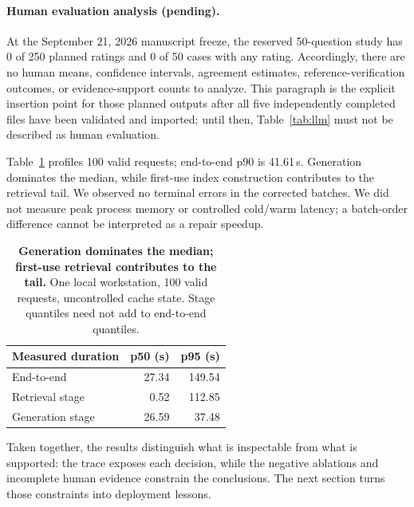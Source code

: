 \paragraph{Human evaluation analysis (pending).}
At the September 21, 2026 manuscript freeze, the reserved 50-question study has 0 of 250 planned ratings and 0 of 50 cases with any rating. Accordingly, there are no human means, confidence intervals, agreement estimates, reference-verification outcomes, or evidence-support counts to analyze. This paragraph is the explicit insertion point for those planned outputs after all five independently completed files have been validated and imported; until then, Table~\ref{tab:llm} must not be described as human evaluation.

Table~\ref{tab:latency} profiles 100 valid requests; end-to-end p90 is 41.61\,s. Generation dominates the median, while first-use index construction contributes to the retrieval tail. We observed no terminal errors in the corrected batches. We did not measure peak process memory or controlled cold/warm latency; a batch-order difference cannot be interpreted as a repair speedup.

\begin{table}[t]
\centering
\small
\begin{tabular}{lrr}
\toprule
Measured duration & p50 (s) & p95 (s) \\
\midrule
End-to-end & 27.34 & 149.54 \\
Retrieval stage & 0.52 & 112.85 \\
Generation stage & 26.59 & 37.48 \\
\bottomrule
\end{tabular}
\caption{\textbf{Generation dominates the median; first-use retrieval contributes to the tail.} One local workstation, 100 valid requests, uncontrolled cache state. Stage quantiles need not add to end-to-end quantiles.}
\label{tab:latency}
\end{table}

Taken together, the results distinguish what is inspectable from what is supported: the trace exposes each decision, while the negative ablations and incomplete human evidence constrain the conclusions. The next section turns those constraints into deployment lessons.
